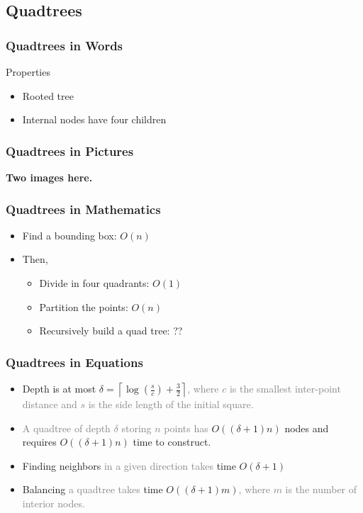 \documentclass{beamer}
\begin{document}
\subsection{Quadtrees}

\begin{frame}
  \frametitle{Quadtrees in Words}
  Properties
  \begin{itemize}
  \item Rooted tree
  \item Internal nodes have four children
  \end{itemize}
\end{frame}

\begin{frame}
  \frametitle{Quadtrees in Pictures}
  \textbf{\Huge Two images here.}
\end{frame}

\begin{frame}
  \frametitle{Quadtrees in Mathematics}
  \begin{itemize}
  \item Find a bounding box: $O(n)$
  \item Then,
    \begin{itemize}
    \item Divide in four quadrants: $O(1)$
    \item Partition the points: $O(n)$
    \item Recursively build a quad tree: ??
    \end{itemize}
  \end{itemize}
\end{frame}

\begin{frame}
  \frametitle{Quadtrees in Equations}
  
  \begin{itemize}
  \item Depth is at most $\delta = \left\lceil
      \log\left(\frac{s}{c}\right) +
      \frac{3}{2}\right\rceil$\textcolor{gray}{, where $c$ is the
      smallest inter-point distance and $s$ is the side length of the
      initial square.} \\[2mm]
    
  \item \textcolor{gray}{A quadtree of depth $\delta$ storing $n$ points has}
    $O((\delta+1)n)$ nodes and requires $O((\delta+1)n)$ time to
    construct. \\[2mm]
    
  \item Finding neighbors \textcolor{gray}{in a given direction takes}
    time $O(\delta+1)$ \\[2mm]

  \item Balancing \textcolor{gray}{a quadtree takes} time
    $O((\delta+1)m)$\textcolor{gray}{, where $m$ is the number of
      interior nodes.}

  \end{itemize}
\end{frame}
\end{document}
